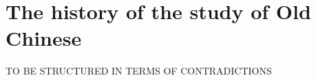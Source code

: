 \chapter{The history of the study of Old Chinese}\label{chapter-7.-History}

TO BE STRUCTURED IN TERMS OF CONTRADICTIONS